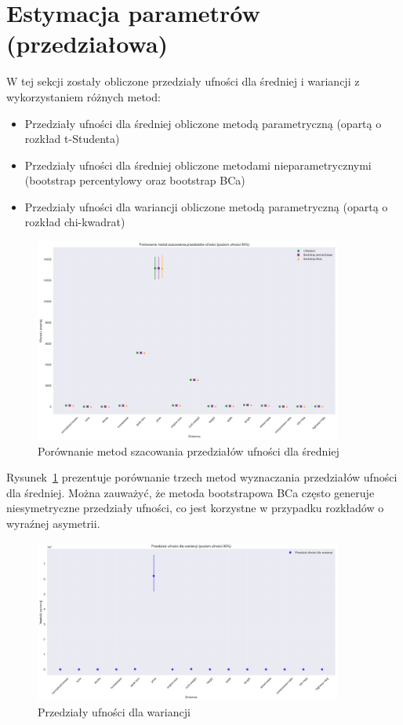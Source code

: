 \documentclass[12pt,a4paper]{article}
\begin{document}
\section{Estymacja parametrów (przedziałowa)}

W tej sekcji zostały obliczone przedziały ufności dla średniej i wariancji z wykorzystaniem różnych metod:
\begin{itemize}
    \item Przedziały ufności dla średniej obliczone metodą parametryczną (opartą o rozkład t-Studenta)
    \item Przedziały ufności dla średniej obliczone metodami nieparametrycznymi (bootstrap percentylowy oraz bootstrap BCa)
    \item Przedziały ufności dla wariancji obliczone metodą parametryczną (opartą o rozkład chi-kwadrat)
\end{itemize}

\begin{figure}[H]
    \centering
    \includegraphics[width=0.9\textwidth]{figures/ci_methods_comparison.png}
    \caption{Porównanie metod szacowania przedziałów ufności dla średniej}
    \label{fig:ci_methods_comparison}
\end{figure}

Rysunek~\ref{fig:ci_methods_comparison} prezentuje porównanie trzech metod wyznaczania przedziałów ufności dla średniej. Można zauważyć, że metoda bootstrapowa BCa często generuje niesymetryczne przedziały ufności, co jest korzystne w przypadku rozkładów o wyraźnej asymetrii.

\begin{figure}[H]
    \centering
    \includegraphics[width=0.9\textwidth]{figures/variance_ci.png}
    \caption{Przedziały ufności dla wariancji}
    \label{fig:variance_ci}
\end{figure}
\end{document}
